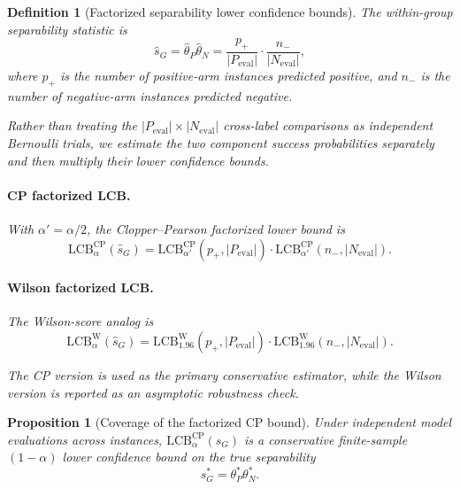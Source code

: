 \documentclass[conference]{IEEEtran}
\newtheorem{proposition}{Proposition}
\newtheorem{definition}{Definition}
\theoremstyle{remark}
\newcommand{\LCB}{\mathrm{LCB}}
\newcommand{\thetaP}{\hat{\theta}_P}
\newcommand{\thetaN}{\hat{\theta}_N}
\newcommand{\shat}{\hat{s}_G}
\newcommand{\pp}{p_{+}}
\newcommand{\nm}{n_{-}}
\begin{document}
\begin{definition}[Factorized separability lower confidence bounds]
\label{def:factlcb}
The within-group separability statistic is
\begin{equation}\label{eq:formula-31}
\shat
=
\thetaP\thetaN
=
\frac{\pp}{|P_{\mathrm{eval}}|}
\cdot
\frac{\nm}{|N_{\mathrm{eval}}|},
\end{equation}
where $\pp$ is the number of positive-arm instances predicted positive, and
$\nm$ is the number of negative-arm instances predicted negative.

Rather than treating the $|P_{\mathrm{eval}}|\times |N_{\mathrm{eval}}|$
cross-label comparisons as independent Bernoulli trials, we estimate the two
component success probabilities separately and then multiply their lower
confidence bounds.

\paragraph{CP factorized LCB.}
With $\alpha'=\alpha/2$, the Clopper--Pearson factorized lower bound is
\begin{equation}\label{eq:formula-32}
\LCB^{\mathrm{CP}}_{\alpha}(\shat)
=
\LCB^{\mathrm{CP}}_{\alpha'}(\pp,|P_{\mathrm{eval}}|)
\cdot
\LCB^{\mathrm{CP}}_{\alpha'}(\nm,|N_{\mathrm{eval}}|).
\end{equation}

\paragraph{Wilson factorized LCB.}
The Wilson-score analog is
\begin{equation}\label{eq:formula-33}
\LCB^{\mathrm{W}}_{\alpha}(\shat)
=
\LCB^{\mathrm{W}}_{1.96}(\pp,|P_{\mathrm{eval}}|)
\cdot
\LCB^{\mathrm{W}}_{1.96}(\nm,|N_{\mathrm{eval}}|).
\end{equation}

The CP version is used as the primary conservative estimator, while the Wilson
version is reported as an asymptotic robustness check.
\end{definition}

\begin{proposition}[Coverage of the factorized CP bound]
\label{prop:coverage}
Under independent model evaluations across instances,
$\LCB^{\mathrm{CP}}_{\alpha}(\shat)$ is a conservative finite-sample
$(1-\alpha)$ lower confidence bound on the true separability
\begin{equation}\label{eq:formula-34}
s_G^*=\theta_P^*\theta_N^* .
\end{equation}
\end{proposition}
\end{document}
